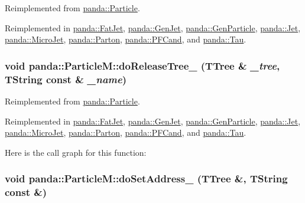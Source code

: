 Reimplemented from \hyperlink{classpanda_1_1Particle_a3c8e5de4513c492b0bad74e5ba551775}{panda::Particle}.

Reimplemented in \hyperlink{classpanda_1_1FatJet_aae0c0b4e50cf6aae1d6c12b31d8585d9}{panda::FatJet}, \hyperlink{classpanda_1_1GenJet_a7d11efd32c760d452e8014c33ba3b64d}{panda::GenJet}, \hyperlink{classpanda_1_1GenParticle_a962c22c6afb1e9d0ef23eb70cfc809b5}{panda::GenParticle}, \hyperlink{classpanda_1_1Jet_ac8801b9ee9b645f4d0a24aa34accb414}{panda::Jet}, \hyperlink{classpanda_1_1MicroJet_a15d337ea6042caf8a37d2f4172b9ab01}{panda::MicroJet}, \hyperlink{classpanda_1_1Parton_a4f94d91e76ce70fca972bcdbafec00c2}{panda::Parton}, \hyperlink{classpanda_1_1PFCand_afef3eb199afc086c2952e479fa1f191b}{panda::PFCand}, and \hyperlink{classpanda_1_1Tau_aed759d7cf1b0e0e47fb34f646e899e5c}{panda::Tau}.\hypertarget{classpanda_1_1ParticleM_a0c24df56cbd50a8223fc4d8bf0b776d0}{
\subsubsection[{doReleaseTree\_\-}]{\setlength{\rightskip}{0pt plus 5cm}void panda::ParticleM::doReleaseTree\_\- (TTree \& {\em \_\-tree}, \/  TString const \& {\em \_\-name})}}
\label{classpanda_1_1ParticleM_a0c24df56cbd50a8223fc4d8bf0b776d0}


Reimplemented from \hyperlink{classpanda_1_1Particle_aff400fb217d44df886826a4ac1f4ca9b}{panda::Particle}.

Reimplemented in \hyperlink{classpanda_1_1FatJet_a8a4681a9c643494786d131103f281aa8}{panda::FatJet}, \hyperlink{classpanda_1_1GenJet_a9a787148306f5a612be76c57fbcf0317}{panda::GenJet}, \hyperlink{classpanda_1_1GenParticle_a7e328cf82b58dcdf43f008066e42e451}{panda::GenParticle}, \hyperlink{classpanda_1_1Jet_a3bc50ef589095a1bae03b1f4bbf74077}{panda::Jet}, \hyperlink{classpanda_1_1MicroJet_a76d94a27064103f68ac0532d7d610889}{panda::MicroJet}, \hyperlink{classpanda_1_1Parton_af0f659274734074ab87ee05f4b1ee6d8}{panda::Parton}, \hyperlink{classpanda_1_1PFCand_adefaef174f963c22f95e9ff84b3b4922}{panda::PFCand}, and \hyperlink{classpanda_1_1Tau_a5e28b6235042855a3e9d3b613c5145e5}{panda::Tau}.

Here is the call graph for this function:\hypertarget{classpanda_1_1ParticleM_ab54d46a237f8d12074ee36c48af33b04}{
\subsubsection[{doSetAddress\_\-}]{\setlength{\rightskip}{0pt plus 5cm}void panda::ParticleM::doSetAddress\_\- (TTree \&, \/  TString const \&)}}
\label{classpanda_1_1ParticleM_ab54d46a237f8d12074ee36c48af33b04}


